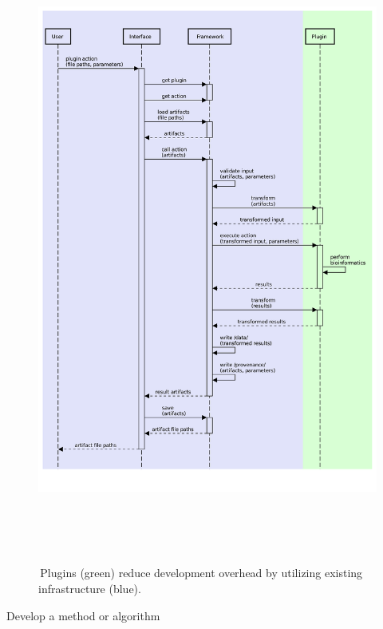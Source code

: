\documentclass[final]{beamer}
\newlength{\colwidth}
\begin{document}
\begin{frame}[t]
\begin{columns}[t]
\begin{column}{\colwidth}
  \begin{figure}[tph!]
  {\includegraphics[height=20cm]{assets/action_call_sequence_diagram}}
  \caption{\,Plugins (green) reduce development overhead by utilizing existing infrastructure (blue).}
  \label{fig:callSequence}
  \end{figure}

  \begin{block}{Develop a method or algorithm}


\end{block}
\end{column}
\end{columns}
\end{frame}
\end{document}
